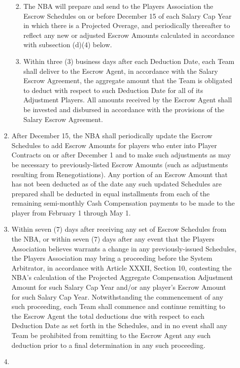 \documentclass[
]{book}
\providecommand{\tightlist}{%
  \setlength{\itemsep}{0pt}\setlength{\parskip}{0pt}}
\begin{document}
\begin{enumerate}
\begin{enumerate}
    \begin{enumerate}
    \def\labelenumiii{(\roman{enumiii})}
    \tightlist
    \item
      The NBA will prepare and send to the Players Association the Escrow Schedules on or before December 15 of each Salary Cap Year in which there is a Projected Overage, and periodically thereafter to reflect any new or adjusted Escrow Amounts calculated in accordance with subsection (d)(4) below.
    \item
      Within three (3) business days after each Deduction Date, each Team shall deliver to the Escrow Agent, in accordance with the Salary Escrow Agreement, the aggregate amount that the Team is obligated to deduct with respect to such Deduction Date for all of its Adjustment Players. All amounts received by the Escrow Agent shall be invested and disbursed in accordance with the provisions of the Salary Escrow Agreement.
    \end{enumerate}
  \item
    After December 15, the NBA shall periodically update the Escrow Schedules to add Escrow Amounts for players who enter into Player Contracts on or after December 1 and to make such adjustments as may be necessary to previously-listed Escrow Amounts (such as adjustments resulting from Renegotiations). Any portion of an Escrow Amount that has not been deducted as of the date any such updated Schedules are prepared shall be deducted in equal installments from each of the remaining semi-monthly Cash Compensation payments to be made to the player from February 1 through May 1.
  \item
    Within seven (7) days after receiving any set of Escrow Schedules from the NBA, or within seven (7) days after any event that the Players Association believes warrants a change in any previously-issued Schedules, the Players Association may bring a proceeding before the System Arbitrator, in accordance with Article XXXII, Section 10, contesting the NBA's calculation of the Projected Aggregate Compensation Adjustment Amount for such Salary Cap Year and/or any player's Escrow Amount for such Salary Cap Year. Notwithstanding the commencement of any such proceeding, each Team shall commence and continue remitting to the Escrow Agent the total deductions due with respect to each Deduction Date as set forth in the Schedules, and in no event shall any Team be prohibited from remitting to the Escrow Agent any such deduction prior to a final determination in any such proceeding.
  \item

\end{enumerate}
\end{enumerate}
\end{document}
